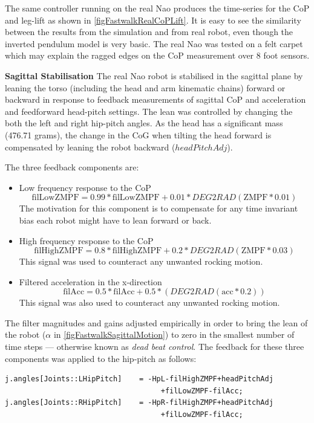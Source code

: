 \documentclass[pdftex,11pt,a4paper]{report}
\begin{document}
The same controller running on the real Nao produces the time-series for the CoP and leg-lift as shown in \autoref{figFastwalkRealCoPLift}. It is easy to see the similarity between the results from the simulation and from real robot, even though the inverted pendulum model is very basic. The real Nao was tested on a felt carpet which may explain the ragged edges on the CoP measurement over 8 foot sensors. 

\textbf{Sagittal Stabilisation}
The real Nao robot is stabilised in the sagittal plane by leaning the torso (including the head and arm kinematic chains) forward or backward in response to feedback measurements of sagittal CoP and acceleration and feedforward head-pitch settings. The lean was controlled by changing the both the left and right hip-pitch angles. As the head has a significant mass (476.71 grams), the change in the CoG when tilting the head forward is compensated by leaning the robot backward ($headPitchAdj$).  

The three feedback components are:
\begin{itemize}
\item Low frequency response to the CoP
$$\textrm{filLowZMPF} = 0.99*\textrm{filLowZMPF} +
0.01*DEG2RAD(\textrm{ZMPF}*0.01)$$
The motivation for this component is to compensate for any time invariant bias
each robot might have to lean forward or back.
\item High frequency response to the CoP
$$\textrm{filHighZMPF} = 0.8*\textrm{filHighZMPF} +
0.2*DEG2RAD(\textrm{ZMPF}*0.03)$$
This signal was used to counteract any unwanted rocking motion.
\item Filtered acceleration in the x-direction
$$\textrm{filAcc} = 0.5*\textrm{filAcc} + 0.5*(DEG2RAD(\textrm{acc}*0.2))$$
This signal was also used to counteract any unwanted rocking motion. 
\end{itemize}

The filter magnitudes and gains adjusted empirically in order to bring the lean of the robot ($\alpha$ in \autoref{figFastwalkSagittalMotion}) to zero in the smallest number of time steps --- otherwise known as \emph{dead beat control}.   The feedback for these three components was applied to the hip-pitch as follows:
\begin{lstlisting}  
j.angles[Joints::LHipPitch]    = -HpL-filHighZMPF+headPitchAdj
                                    +filLowZMPF-filAcc;
j.angles[Joints::RHipPitch]    = -HpR-filHighZMPF+headPitchAdj
                                    +filLowZMPF-filAcc;
\end{lstlisting}    
\end{document}
